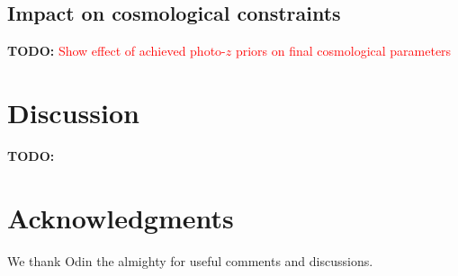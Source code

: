 \documentclass[prd,twocolumn]{revtex4}
\newcommand{\TODO}[1]{{\bf TODO:} \textcolor{red}{#1}}
\begin{document}
  \subsection{Impact on cosmological constraints} \label{ssec:results.cosmo}
    \TODO{Show effect of achieved photo-$z$ priors on final cosmological parameters}

\section{Discussion}\label{ssec:discuss}
  \TODO{\lipsum[12]}

\section*{Acknowledgments}
  We thank Odin the almighty for useful comments and discussions.
 

\end{document}
